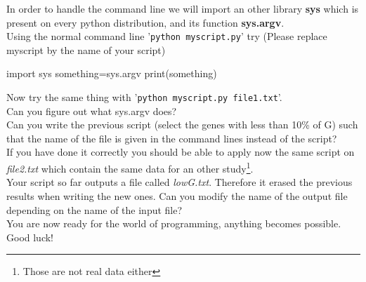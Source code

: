 \documentclass[article,10pt]{scrartcl}
\begin{document}
In order to handle the command line we will import an other library \textbf{sys} which is present on every python distribution, and its function \textbf{sys.argv}.\\
Using the normal command line '\texttt{python myscript.py}' try (Please replace myscript by the name of your script)
\begin{python}
import sys
something=sys.argv
print(something)
\end{python}
Now try the same thing with '\texttt{python myscript.py file1.txt}'.\\
Can you figure out what sys.argv does?\\


Can you write the previous script (select the genes with less than 10\% of G) such that the name of the file is given in the command lines instead of the script?\\


If you have done it correctly you should be able to apply now the same script on \textit{file2.txt} which contain the same data for an other study\footnote{Those are not real data either}.\\
Your script so far outputs a file called \textit{lowG.txt}. Therefore it erased the previous results when writing the new ones. Can you modify the name of the output file depending on the name of the input file?
\\

You are now ready for the world of programming, anything becomes possible. Good luck!
\end{document}
